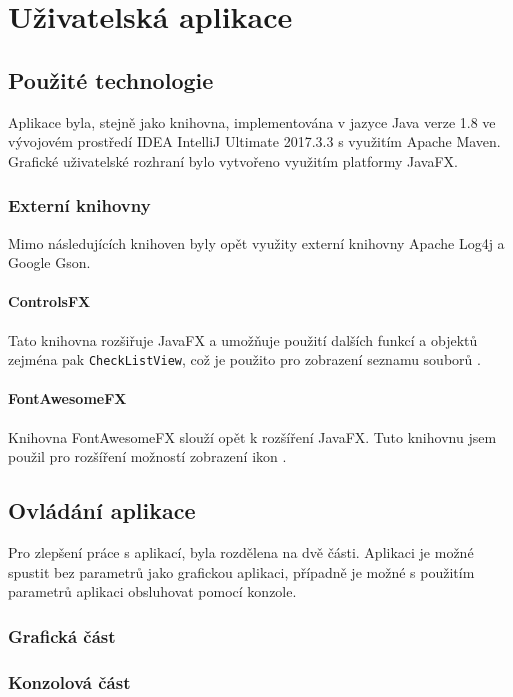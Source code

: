 	\section{Uživatelská aplikace}
	   \subsection{Použité technologie}
	    	 Aplikace byla, stejně jako knihovna, implementována v jazyce Java verze 1.8 ve vývojovém prostředí IDEA IntelliJ Ultimate 2017.3.3 s využitím Apache Maven. Grafické uživatelské rozhraní bylo vytvořeno využitím platformy JavaFX. 
	    	 
	    	 \subsubsection{Externí knihovny}
				Mimo následujících knihoven byly opět využity externí knihovny Apache Log4j a Google Gson.
			
			\paragraph{ControlsFX} 
				Tato knihovna rozšiřuje JavaFX a umožňuje použití dalších funkcí a objektů zejména pak \texttt{CheckListView}, což je použito pro zobrazení seznamu souborů \cite{controlsfx}. 
			
			\paragraph{FontAwesomeFX} 	
				Knihovna FontAwesomeFX slouží opět k rozšíření JavaFX. Tuto knihovnu jsem použil pro rozšíření možností zobrazení ikon \cite{fontawesomefx}.	 
		
		
	    	   
	   \subsection{Ovládání aplikace}
	   		Pro zlepšení práce s aplikací, byla rozdělena na dvě části. Aplikaci je možné spustit bez parametrů jako grafickou aplikaci, případně je možné s použitím parametrů aplikaci obsluhovat pomocí konzole.
	   		
	   		\subsubsection{Grafická část}
					   		
	   		
	   		\subsubsection{Konzolová část}
	   
